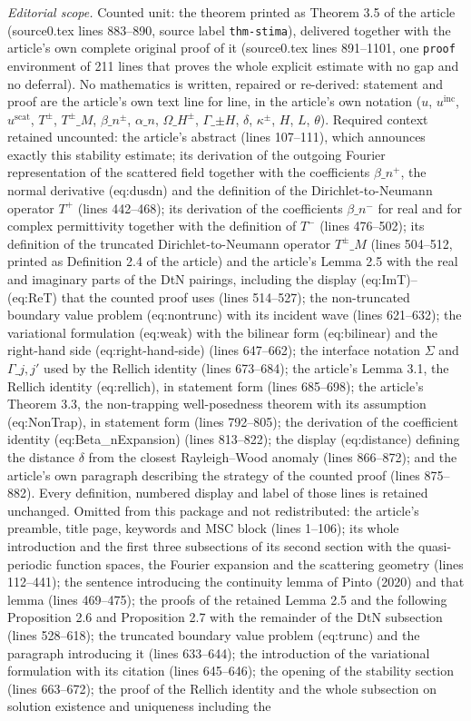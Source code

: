 \documentclass[10pt,a4paper]{amsart}
\newcommand{\inc}{{\mathrm{inc}}}
\newcommand{\scat}{{\mathrm{scat}}}
\begin{document}
\noindent\textit{Editorial scope.} Counted unit: the theorem printed as Theorem 3.5 of the article (source0.tex lines 883--890, source label \texttt{thm-stima}), delivered together with the article's own complete original proof of it (source0.tex lines 891--1101, one \texttt{proof} environment of 211 lines that proves the whole explicit estimate with no gap and no deferral). No mathematics is written, repaired or re-derived: statement and proof are the article's own text line for line, in the article's own notation ($u$, $u^\inc$, $u^\scat$, $T^\pm$, $T^\pm\_M$, $\beta\_n^\pm$, $\alpha\_n$, $\Omega\_H^\pm$, $\Gamma\_{\pm H}$, $\delta$, $\kappa^\pm$, $H$, $L$, $\theta$). Required context retained uncounted: the article's abstract (lines 107--111), which announces exactly this stability estimate; its derivation of the outgoing Fourier representation of the scattered field together with the coefficients $\beta\_n^+$, the normal derivative (eq:dusdn) and the definition of the Dirichlet-to-Neumann operator $T^+$ (lines 442--468); its derivation of the coefficients $\beta\_n^-$ for real and for complex permittivity together with the definition of $T^-$ (lines 476--502); its definition of the truncated Dirichlet-to-Neumann operator $T^\pm\_M$ (lines 504--512, printed as Definition 2.4 of the article) and the article's Lemma 2.5 with the real and imaginary parts of the DtN pairings, including the display (eq:ImT)--(eq:ReT) that the counted proof uses (lines 514--527); the non-truncated boundary value problem (eq:nontrunc) with its incident wave (lines 621--632); the variational formulation (eq:weak) with the bilinear form (eq:bilinear) and the right-hand side (eq:right-hand-side) (lines 647--662); the interface notation $\Sigma$ and $\Gamma\_{j,j'}$ used by the Rellich identity (lines 673--684); the article's Lemma 3.1, the Rellich identity (eq:rellich), in statement form (lines 685--698); the article's Theorem 3.3, the non-trapping well-posedness theorem with its assumption (eq:NonTrap), in statement form (lines 792--805); the derivation of the coefficient identity (eq:Beta\_nExpansion) (lines 813--822); the display (eq:distance) defining the distance $\delta$ from the closest Rayleigh--Wood anomaly (lines 866--872); and the article's own paragraph describing the strategy of the counted proof (lines 875--882). Every definition, numbered display and label of those lines is retained unchanged. Omitted from this package and not redistributed: the article's preamble, title page, keywords and MSC block (lines 1--106); its whole introduction and the first three subsections of its second section with the quasi-periodic function spaces, the Fourier expansion and the scattering geometry (lines 112--441); the sentence introducing the continuity lemma of Pinto (2020) and that lemma (lines 469--475); the proofs of the retained Lemma 2.5 and the following Proposition 2.6 and Proposition 2.7 with the remainder of the DtN subsection (lines 528--618); the truncated boundary value problem (eq:trunc) and the paragraph introducing it (lines 633--644); the introduction of the variational formulation with its citation (lines 645--646); the opening of the stability section (lines 663--672); the proof of the Rellich identity and the whole subsection on solution existence and uniqueness including the 
\end{document}
